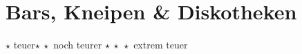 \newcommand{\place}[4]{\item[(\stepcounter{zahl}\thezahl) #1](#2)\\ #3\\\emph{Preis:} #4}


\section{Bars, Kneipen \& Diskotheken}
$\star$ teuer\quad $\star\ \star$ noch teurer \quad $\star\ \star\ \star$ extrem teuer

\begin{figure*}
    \altstadtkarte
\end{figure*}

